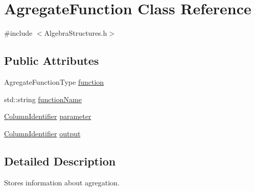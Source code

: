 \hypertarget{class_agregate_function}{\section{Agregate\+Function Class Reference}
\label{class_agregate_function}
}


{\ttfamily \#include $<$Algebra\+Structures.\+h$>$}

\subsection*{Public Attributes}
\begin{DoxyCompactItemize}
\item 
Agregate\+Function\+Type \hyperlink{class_agregate_function_afc2ef5318021e8fa5aac765f48cc2561}{function}
\item 
std\+::string \hyperlink{class_agregate_function_a06046f10f3072c4ef6300b51f283ed3f}{function\+Name}
\item 
\hyperlink{class_column_identifier}{Column\+Identifier} \hyperlink{class_agregate_function_ad37427d3dee4bc5dc7a76d5997bb22fc}{parameter}
\item 
\hyperlink{class_column_identifier}{Column\+Identifier} \hyperlink{class_agregate_function_ae78c0ff39b17f1d341f89c6660d7f448}{output}
\end{DoxyCompactItemize}


\subsection{Detailed Description}
Stores information about agregation. 

